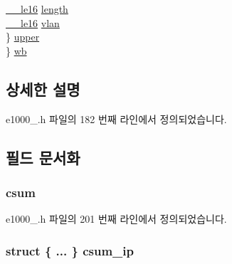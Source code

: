 \begin{DoxyCompactItemize}
\begin{tabbing}
\>\>\hyperlink{lib_2igb_2e1000__osdep_8h_a42b303dec823d42e18116e091891a235}{\_\_le16} \hyperlink{unione1000__adv__rx__desc_adb05ebb496f195c1ce4e49f46fb420f0}{length}\\
\>\>\hyperlink{lib_2igb_2e1000__osdep_8h_a42b303dec823d42e18116e091891a235}{\_\_le16} \hyperlink{unione1000__adv__rx__desc_ae51e377f3b473a4541af0505e74399ae}{vlan}\\
\>\} \hyperlink{unione1000__adv__rx__desc_a8039727b516a85c8d401e7d334c98a3b}{upper}\\
\} \hyperlink{unione1000__adv__rx__desc_a673183f8ee4467a2a46c583bfbf80557}{wb}\\

\end{tabbing}\end{DoxyCompactItemize}


\subsection{상세한 설명}


e1000\+\_.\+h 파일의 182 번째 라인에서 정의되었습니다.



\subsection{필드 문서화}
\subsubsection[{\texorpdfstring{csum}{csum}}]{ csum}\hypertarget{unione1000__adv__rx__desc_ab0c14ac455d34425586c90498f0bd29f}{}\label{unione1000__adv__rx__desc_ab0c14ac455d34425586c90498f0bd29f}


e1000\+\_.\+h 파일의 201 번째 라인에서 정의되었습니다.

\subsubsection[{\texorpdfstring{csum\+\_\+ip}{csum_ip}}]{\setlength{\rightskip}{0pt plus 5cm}struct \{ ... \}   csum\+\_\+ip}\hypertarget{unione1000__adv__rx__desc_a0046ebbf120d47c7fbcbe967fdc2fca0}{}\label{unione1000__adv__rx__desc_a0046ebbf120d47c7fbcbe967fdc2fca0}
